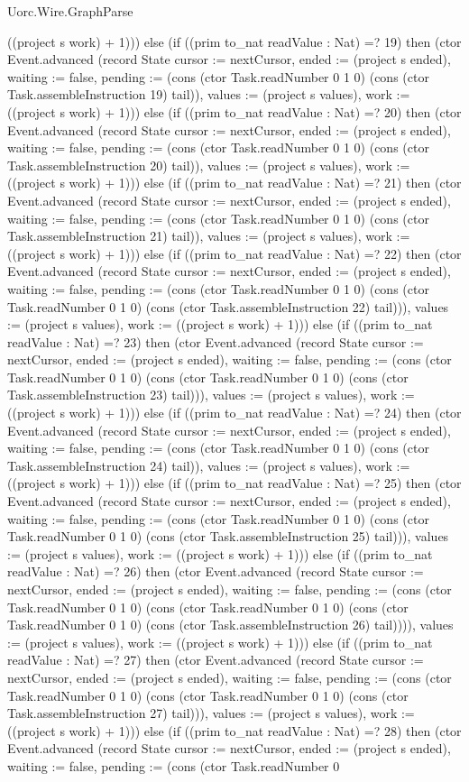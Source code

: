 \begin{lexlean}{Uorc.Wire.GraphParse}
\begin{semanticmodule}
{((project s work) + 1)})) else (if ((prim to_nat readValue : Nat) =? 19) then (ctor Event.advanced (record State {cursor := nextCursor, ended := (project s ended), waiting := false, pending := (cons (ctor Task.readNumber 0 1 0) (cons (ctor Task.assembleInstruction 19) tail)), values := (project s values), work := ((project s work) + 1)})) else (if ((prim to_nat readValue : Nat) =? 20) then (ctor Event.advanced (record State {cursor := nextCursor, ended := (project s ended), waiting := false, pending := (cons (ctor Task.readNumber 0 1 0) (cons (ctor Task.assembleInstruction 20) tail)), values := (project s values), work := ((project s work) + 1)})) else (if ((prim to_nat readValue : Nat) =? 21) then (ctor Event.advanced (record State {cursor := nextCursor, ended := (project s ended), waiting := false, pending := (cons (ctor Task.readNumber 0 1 0) (cons (ctor Task.assembleInstruction 21) tail)), values := (project s values), work := ((project s work) + 1)})) else (if ((prim to_nat readValue : Nat) =? 22) then (ctor Event.advanced (record State {cursor := nextCursor, ended := (project s ended), waiting := false, pending := (cons (ctor Task.readNumber 0 1 0) (cons (ctor Task.readNumber 0 1 0) (cons (ctor Task.assembleInstruction 22) tail))), values := (project s values), work := ((project s work) + 1)})) else (if ((prim to_nat readValue : Nat) =? 23) then (ctor Event.advanced (record State {cursor := nextCursor, ended := (project s ended), waiting := false, pending := (cons (ctor Task.readNumber 0 1 0) (cons (ctor Task.readNumber 0 1 0) (cons (ctor Task.assembleInstruction 23) tail))), values := (project s values), work := ((project s work) + 1)})) else (if ((prim to_nat readValue : Nat) =? 24) then (ctor Event.advanced (record State {cursor := nextCursor, ended := (project s ended), waiting := false, pending := (cons (ctor Task.readNumber 0 1 0) (cons (ctor Task.assembleInstruction 24) tail)), values := (project s values), work := ((project s work) + 1)})) else (if ((prim to_nat readValue : Nat) =? 25) then (ctor Event.advanced (record State {cursor := nextCursor, ended := (project s ended), waiting := false, pending := (cons (ctor Task.readNumber 0 1 0) (cons (ctor Task.readNumber 0 1 0) (cons (ctor Task.assembleInstruction 25) tail))), values := (project s values), work := ((project s work) + 1)})) else (if ((prim to_nat readValue : Nat) =? 26) then (ctor Event.advanced (record State {cursor := nextCursor, ended := (project s ended), waiting := false, pending := (cons (ctor Task.readNumber 0 1 0) (cons (ctor Task.readNumber 0 1 0) (cons (ctor Task.readNumber 0 1 0) (cons (ctor Task.assembleInstruction 26) tail)))), values := (project s values), work := ((project s work) + 1)})) else (if ((prim to_nat readValue : Nat) =? 27) then (ctor Event.advanced (record State {cursor := nextCursor, ended := (project s ended), waiting := false, pending := (cons (ctor Task.readNumber 0 1 0) (cons (ctor Task.readNumber 0 1 0) (cons (ctor Task.assembleInstruction 27) tail))), values := (project s values), work := ((project s work) + 1)})) else (if ((prim to_nat readValue : Nat) =? 28) then (ctor Event.advanced (record State {cursor := nextCursor, ended := (project s ended), waiting := false, pending := (cons (ctor Task.readNumber 0 }
\end{semanticmodule}
\end{lexlean}
